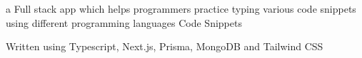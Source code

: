 

\begin{cventries}

  \projectentry
    {a Full stack app which helps programmers practice typing various code snippets using different programming languages} %
    {Code Snippets 
      } %
    {} %
    {}
    {
      \begin{cvitems} %
        \item {Written using Typescript, Next.js, Prisma, MongoDB and Tailwind CSS}
      \end{cvitems}
    }

\end{cventries}
